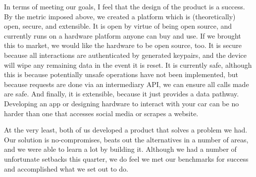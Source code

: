 \documentclass[10pt,letterpaper,unboxed,cm]{article}
\begin{document}
In terms of meeting our goals, I feel that the design of the product is a success. By the metric imposed above, we created a platform which is (theoretically) open, secure, and extensible. It is open by virtue of being open source, and currently runs on a hardware platform anyone can buy and use. If we brought this to market, we would like the hardware to be open source, too. It is secure because all interactions are authenticated by generated keypairs, and the device will wipe any remaining data in the event it is reset. It is currently safe, although this is because potentially unsafe operations have not been implemented, but because requests are done via an intermediary API, we can ensure all calls made are safe. And finally, it is extensible, because it just provides a data pathway. Developing an app or designing hardware to interact with your car can be no harder than one that accesses social media or scrapes a website.

At the very least, both of us developed a product that solves a problem we had. Our solution is no-compromises, beats out the alternatives in a number of areas, and we were able to learn a lot by building it. Although we had a number of unfortunate setbacks this quarter, we do feel we met our benchmarks for success and accomplished what we set out to do.
\end{document}
